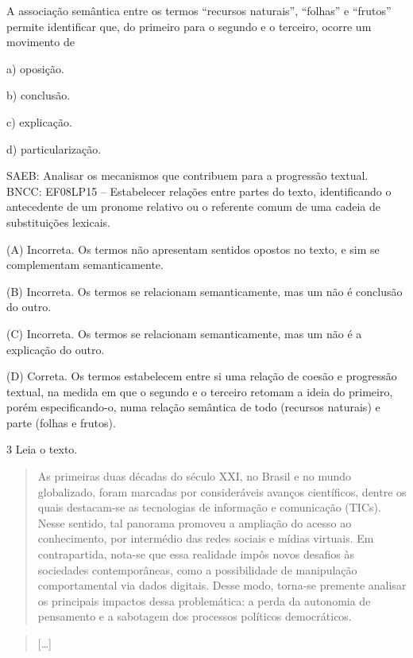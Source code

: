 
A associação semântica entre os termos ``recursos naturais'', ``folhas''
e ``frutos'' permite identificar que, do primeiro para o segundo e o
terceiro, ocorre um movimento de

a) oposição.

b) conclusão.

c) explicação.

d) particularização.

SAEB: Analisar os mecanismos que contribuem para a progressão textual.
BNCC: EF08LP15 -- Estabelecer relações entre partes do texto,
identificando o antecedente de um pronome relativo ou o referente comum
de uma cadeia de substituições lexicais.

(A) Incorreta. Os termos não apresentam sentidos opostos no texto, e sim
se complementam semanticamente.

(B) Incorreta. Os termos se relacionam semanticamente, mas um não é
conclusão do outro.

(C) Incorreta. Os termos se relacionam semanticamente, mas um não é a
explicação do outro.

(D) Correta. Os termos estabelecem entre si uma relação de coesão e
progressão textual, na medida em que o segundo e o terceiro retomam a
ideia do primeiro, porém especificando-o, numa relação semântica de todo
(recursos naturais) e parte (folhas e frutos).

\num{3} Leia o texto.

\begin{quote}
As primeiras duas décadas do século XXI, no Brasil e no mundo
globalizado, foram marcadas por consideráveis avanços científicos,
dentre os quais destacam-se as tecnologias de informação e comunicação
(TICs). Nesse sentido, tal panorama promoveu a ampliação do acesso ao
conhecimento, por intermédio das redes sociais e mídias virtuais. Em
contrapartida, nota-se que essa realidade impôs novos desafios às
sociedades contemporâneas, como a possibilidade de manipulação
comportamental via dados digitais. Desse modo, torna-se premente
analisar os principais impactos dessa problemática: a perda da autonomia
de pensamento e a sabotagem dos processos políticos democráticos.
\end{quote}

\begin{quote}
{[}\ldots{]}
\end{quote}

